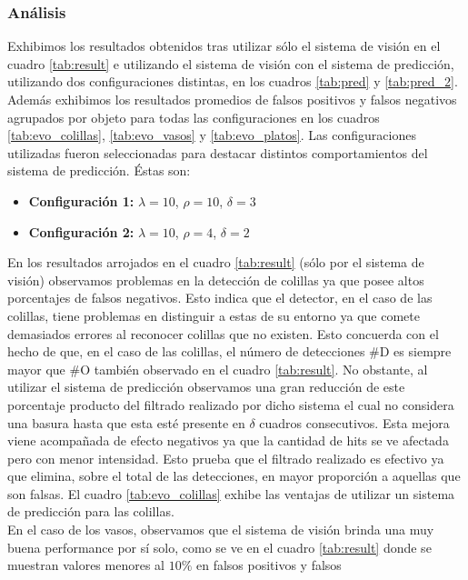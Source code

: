 \subsubsection{An\'alisis}
Exhibimos los resultados obtenidos tras utilizar s\'olo el sistema de 
visi\'on en el cuadro \ref{tab:result} e utilizando el sistema de 
visi\'on con el sistema de predicci\'on, utilizando dos configuraciones 
distintas, en 
los cuadros \ref{tab:pred} y  \ref{tab:pred_2}. Adem\'as exhibimos los 
resultados promedios de falsos positivos y falsos negativos agrupados 
por objeto para todas las configuraciones en los cuadros \ref{tab:evo_colillas}, 
\ref{tab:evo_vasos} y \ref{tab:evo_platos}. Las configuraciones 
utilizadas fueron seleccionadas para destacar distintos comportamientos del 
sistema de predicci\'on. \'Estas son:
\begin{itemize}
\item{\textbf{Configuraci\'on 1:} $\lambda=10$, $\rho=10$, $\delta=3$}
	\item{\textbf{Configuraci\'on 2:} $\lambda=10$, $\rho=4$, $\delta=2$}
\end{itemize}
\indent En los resultados arrojados en el cuadro \ref{tab:result} 
(s\'olo por el sistema de visi\'on) observamos problemas en la  detecci\'on de colillas ya que posee altos 
porcentajes de falsos negativos. Esto indica que el detector, en el 
caso de las colillas, tiene
problemas en distinguir a estas de su entorno ya que comete 
demasiados errores al reconocer colillas que no existen. Esto concuerda 
con el hecho de que, en el caso de las colillas, el n\'umero de 
detecciones \#D es siempre mayor que \#O tambi\'en observado en el 
cuadro \ref{tab:result}. No obstante, al utilizar el sistema de 
predicci\'on observamos una gran reducci\'on de este porcentaje producto 
del filtrado realizado por dicho sistema el cual no considera una 
basura hasta que esta est\'e presente en $\delta$ cuadros consecutivos.  
Esta mejora viene acompa\~nada de efecto negativos ya que la cantidad de 
hits se ve afectada pero con menor intensidad. Esto prueba que el 
filtrado realizado es efectivo ya que elimina, sobre el total de las 
detecciones, en mayor proporci\'on a 
aquellas que son falsas. El cuadro \ref{tab:evo_colillas} exhibe las ventajas de utilizar un sistema de 
predicci\'on para las colillas.\\
\indent 
En el caso de los vasos, observamos que el sistema de visi\'on brinda 
una muy buena performance por s\'i solo, como se ve en el cuadro \ref{tab:result} 
donde se muestran valores menores al $10\%$ en falsos positivos y falsos 
